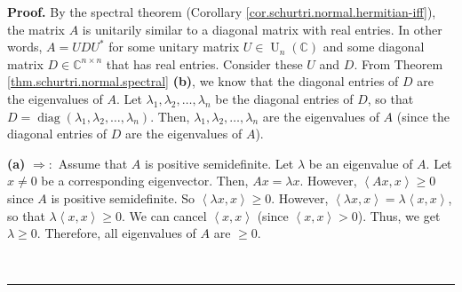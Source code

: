 \documentclass[numbers=enddot,12pt,final,onecolumn,notitlepage]{scrartcl}%
\numberwithin{exer}{subsection}
\theoremstyle{definition}
\newenvironment{proof}[1][Proof]{\noindent\textbf{#1.} }{\ \rule{0.5em}{0.5em}}
\begin{document}
\begin{proof}
By the spectral theorem (Corollary \ref{cor.schurtri.normal.hermitian-iff}),
the matrix $A$ is unitarily similar to a diagonal matrix with real entries. In
other words, $A=UDU^{\ast}$ for some unitary matrix $U\in\operatorname*{U}%
\nolimits_{n}\left(  \mathbb{C}\right)  $ and some diagonal matrix
$D\in\mathbb{C}^{n\times n}$ that has real entries. Consider these $U$ and
$D$. From Theorem \ref{thm.schurtri.normal.spectral} \textbf{(b)}, we know
that the diagonal entries of $D$ are the eigenvalues of $A$. Let $\lambda
_{1},\lambda_{2},\ldots,\lambda_{n}$ be the diagonal entries of $D$, so that
$D=\operatorname*{diag}\left(  \lambda_{1},\lambda_{2},\ldots,\lambda
_{n}\right)  $. Then, $\lambda_{1},\lambda_{2},\ldots,\lambda_{n}$ are the
eigenvalues of $A$ (since the diagonal entries of $D$ are the eigenvalues of
$A$). \medskip

\textbf{(a)} $\Longrightarrow:$ Assume that $A$ is positive semidefinite. Let
$\lambda$ be an eigenvalue of $A$. Let $x\neq0$ be a corresponding
eigenvector. Then, $Ax=\lambda x$. However, $\left\langle Ax,x\right\rangle
\geq0$ since $A$ is positive semidefinite. So $\left\langle \lambda
x,x\right\rangle \geq0$. However, $\left\langle \lambda x,x\right\rangle
=\lambda\left\langle x,x\right\rangle $, so that $\lambda\left\langle
x,x\right\rangle \geq0$. We can cancel $\left\langle x,x\right\rangle $ (since
$\left\langle x,x\right\rangle >0$). Thus, we get $\lambda\geq0$. Therefore,
all eigenvalues of $A$ are $\geq0$.


\end{proof}
\end{document}
